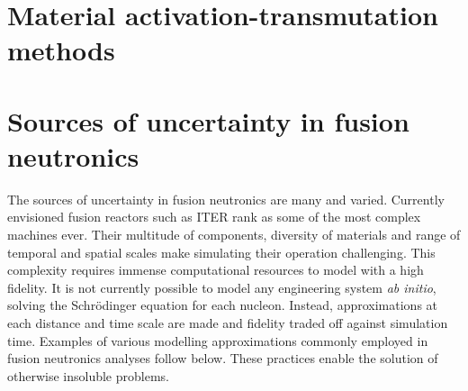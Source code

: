 \section{Material activation-transmutation methods}

\section{Sources of uncertainty in fusion neutronics}
The sources of uncertainty in fusion neutronics are many and varied. Currently envisioned fusion reactors such as ITER rank as some of the most complex machines ever. Their multitude of components, diversity of materials and range of temporal and spatial scales make simulating their operation challenging. This complexity requires immense computational resources to model with a high fidelity. It is not currently possible to model any engineering system \textit{ab initio}, solving the Schr{\"o}dinger equation for each nucleon. Instead, approximations at each distance and time scale are made and fidelity traded off against simulation time. Examples of various modelling approximations commonly employed in fusion neutronics analyses follow below. These practices enable the solution of otherwise insoluble problems.  

